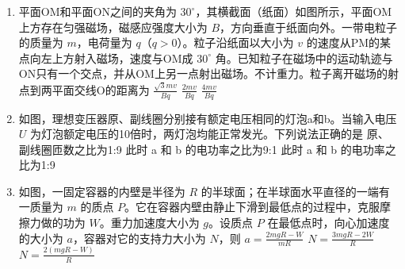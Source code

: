 \documentclass[\gkver]{gaokaozhenti}
\begin{document}
\begin{enumerate}

\item
平面OM和平面ON之间的夹角为 $30^{\circ}$，其横截面（纸面）如图所示，平面OM上方存在匀强磁场，磁感应强度大小为 $B$，方向垂直于纸面向外。一带电粒子的质量为 $m$，电荷量为 $q$（$q>0$）。粒子沿纸面以大小为 $v$ 的速度从PM的某点向左上方射入磁场，速度与OM成 $30^{\circ}$ 角。已知粒子在磁场中的运动轨迹与ON只有一个交点，并从OM上另一点射出磁场。不计重力。粒子离开磁场的射点到两平面交线O的距离为
{$\frac{\sqrt{3}mv}{Bq}$}
{$\frac{2mv}{Bq}$}
{$\frac{4mv}{Bq}$}


\item
如图，理想变压器原、副线圈分别接有额定电压相同的灯泡a和b。当输入电压 $U$ 为灯泡额定电压的10倍时，两灯泡均能正常发光。下列说法正确的是
{原、副线圈匝数之比为1:9}
{此时 a 和 b 的电功率之比为9:1}
{此时 a 和 b 的电功率之比为1:9}


\item
如图，一固定容器的内壁是半径为 $R$ 的半球面；在半球面水平直径的一端有一质量为 $m$ 的质点 $P$。它在容器内壁由静止下滑到最低点的过程中，克服摩擦力做的功为 $W$。重力加速度大小为 $g$。设质点 $P$ 在最低点时，向心加速度的大小为 $a$，容器对它的支持力大小为 $N$，则
\onepicture[w=4.14cm]{}
{$a=\frac{2mgR-W}{mR}$}
{$N=\frac{3mgR-2W}{R}$}
{$N=\frac{2(mgR-W)}{R}$}


\end{enumerate}
\end{document}
